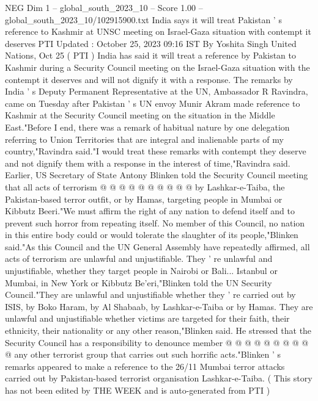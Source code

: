 \begin{textsample}{NEG Dim 1 – global\_south\_2023\_10 – Score 1.00 – global\_south\_2023\_10/102915900.txt}  \label{ex:f1_neg_267}
India says it will treat Pakistan ' s reference to Kashmir at UNSC meeting on Israel-Gaza situation with contempt it deserves PTI Updated : October 25, 2023 09:16 IST By Yoshita Singh United Nations, Oct 25 ( PTI ) India has said it will treat a reference by Pakistan to Kashmir during a Security Council meeting on the Israel-Gaza situation with the contempt it deserves and will not dignify it with a response.
The remarks by India ' s Deputy Permanent Representative at the UN, Ambassador R Ravindra, came on Tuesday after Pakistan ' s UN envoy Munir Akram made reference to Kashmir at the Security Council meeting on the situation in the Middle East."Before I end, there was a remark of habitual nature by one delegation referring to Union Territories that are integral and inalienable parts of my country,"Ravindra said."I would treat these remarks with contempt they deserve and not dignify them with a response in the interest of time,"Ravindra said.
Earlier, US Secretary of State Antony Blinken told the Security Council meeting that all acts of terrorism @ @ @ @ @ @ @ @ @ @ by Lashkar-e-Taiba, the Pakistan-based terror outfit, or by Hamas, targeting people in Mumbai or Kibbutz Beeri."We must affirm the right of any nation to defend itself and to prevent such horror from repeating itself.
No member of this Council, no nation in this entire body could or would tolerate the slaughter of its people,"Blinken said."As this Council and the UN General Assembly have repeatedly affirmed, all acts of terrorism are unlawful and unjustifiable.
They ' re unlawful and unjustifiable, whether they target people in Nairobi or Bali...
Istanbul or Mumbai, in New York or Kibbutz Be'eri,"Blinken told the UN Security Council."They are unlawful and unjustifiable whether they ' re carried out by ISIS, by Boko Haram, by Al Shabaab, by Lashkar-e-Taiba or by Hamas.
They are unlawful and unjustifiable whether victims are targeted for their faith, their ethnicity, their nationality or any other reason,"Blinken said.
He stressed that the Security Council has a responsibility to denounce member @ @ @ @ @ @ @ @ @ @ any other terrorist group that carries out such horrific acts."Blinken ' s remarks appeared to make a reference to the 26/11 Mumbai terror attacks carried out by Pakistan-based terrorist organisation Lashkar-e-Taiba. ( This story has not been edited by THE WEEK and is auto-generated from PTI )

\end{textsample}
